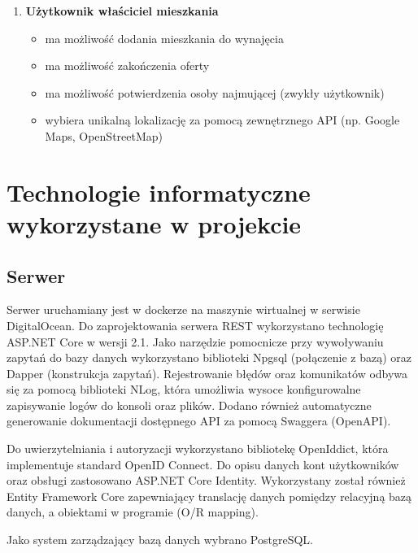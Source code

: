 \documentclass[polish, 11pt]{article}
\begin{document}
\begin{enumerate}
            \item \textbf{Użytkownik właściciel mieszkania}
            \begin{itemize}
                \item ma możliwość dodania mieszkania do wynajęcia
                \item ma możliwość zakończenia oferty
                \item ma możliwość potwierdzenia osoby najmującej (zwykły użytkownik)
                \item wybiera unikalną lokalizację za pomocą zewnętrznego API (np. Google Maps, OpenStreetMap)
            \end{itemize}
        \end{enumerate}
        
\section{Technologie informatyczne wykorzystane w projekcie}
    \subsection{Serwer}
        Serwer uruchamiany jest w dockerze na maszynie wirtualnej w serwisie DigitalOcean.
        Do zaprojektowania serwera REST wykorzystano technologię ASP.NET Core w wersji 2.1.
        Jako narzędzie pomocnicze przy wywoływaniu zapytań do bazy danych wykorzystano biblioteki Npgsql (połączenie z bazą) oraz Dapper (konstrukcja zapytań).
        Rejestrowanie błędów oraz komunikatów odbywa się za pomocą biblioteki NLog, która umożliwia wysoce konfigurowalne zapisywanie logów do konsoli oraz plików.
        Dodano również automatyczne generowanie dokumentacji dostępnego API za pomocą Swaggera (OpenAPI).
            
        Do uwierzytelniania i autoryzacji wykorzystano bibliotekę OpenIddict, która implementuje standard OpenID Connect.
        Do opisu danych kont użytkowników oraz obsługi zastosowano ASP.NET Core Identity.
        Wykorzystany został również Entity Framework Core zapewniający translację danych pomiędzy relacyjną bazą danych, a obiektami w programie (O/R mapping).
        
        Jako system zarządzający bazą danych wybrano PostgreSQL.
\end{document}
